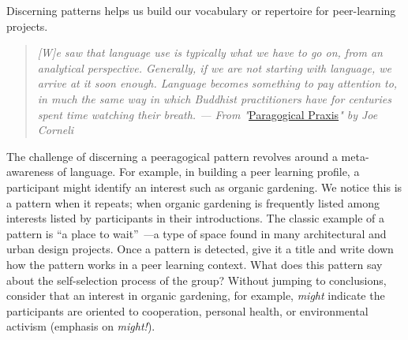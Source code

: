 Discerning patterns helps us build our vocabulary or repertoire for
peer-learning projects.

\begin{quote}
\emph{{[}W{]}e saw that language use is typically what we have to go on,
from an analytical perspective. Generally, if we are not starting with
language, we arrive at it soon enough. Language becomes something to pay
attention to, in much the same way in which Buddhist practitioners have
for centuries spent time watching their breath. --- From
"}\href{http://paragogy.net/ParagogicalPraxisPaper}{Paragogical
Praxis}\emph{" by Joe Corneli}
\end{quote}
The challenge of discerning a peeragogical pattern revolves around a
meta-awareness of language. For example, in building a peer learning
profile, a participant might identify an interest such as organic
gardening. We notice this is a pattern when it repeats; when organic
gardening is frequently listed among interests listed by participants in
their introductions. The classic example of a pattern is ``a place to
wait'' \emph{---}a type of space found in many architectural and urban
design projects. Once a pattern is detected, give it a title and write
down how the pattern works in a peer learning context. What does this
pattern say about the self-selection process of the group? Without
jumping to conclusions, consider that an interest in organic gardening,
for example, \emph{might} indicate the participants are oriented to
cooperation, personal health, or environmental activism (emphasis on
\emph{might!}).

